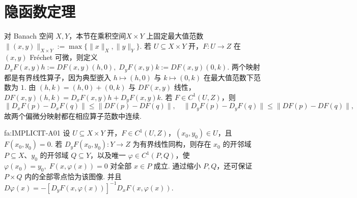 \section{隐函数定理}\label{sec:iii02-implicit}

对 Banach 空间 \(\displaystyle X,Y\)，本节在乘积空间\(\displaystyle X\times Y\) 上固定最大值范数
\(\displaystyle \|(x,y)\|_{X\times Y} := \max\{\|x\|_X,\|y\|_Y\}.\)
若 \(\displaystyle U\subseteq X\times Y\) 开，\(\displaystyle F:U\to Z\) 在 \(\displaystyle(x,y)\) Fréchet 可微，则定义
\(\displaystyle D_xF(x,y)h := DF(x,y)(h,0), \; D_yF(x,y)k := DF(x,y)(0,k).\)
两个映射都是有界线性算子，因为典型嵌入 \(\displaystyle h\mapsto(h,0)\) 与 \(\displaystyle k\mapsto(0,k)\) 在最大值范数下范数为 \(\displaystyle1\). 由 \(\displaystyle(h,k)=(h,0)+(0,k)\) 与 \(\displaystyle DF(x,y)\) 线性，
\(\displaystyle DF(x,y)(h,k) = D_xF(x,y)h+D_yF(x,y)k.\)
若 \(\displaystyle F\in C^1(U,Z)\)，则
\[
\|D_xF(p)-D_xF(q)\|
\leqslant
\|DF(p)-DF(q)\|,
\quad
\|D_yF(p)-D_yF(q)\|
\leqslant
\|DF(p)-DF(q)\|,
\]
故两个偏微分映射都在相应算子范数中连续.

\begin{FATheorem}{fa:IMPLICIT-A01}
设 \(\displaystyle U\subseteq X\times Y\) 开，\(\displaystyle F\in C^1(U,Z)\)，\(\displaystyle(x_0,y_0)\in U\)，且
\(\displaystyle F(x_0,y_0)=0.\)
若
\(\displaystyle D_yF(x_0,y_0):Y\to Z\)
为有界线性同构，则存在 \(\displaystyle x_0\) 的开邻域 \(\displaystyle P\subseteq X\)、\(\displaystyle y_0\) 的开邻域 \(\displaystyle Q\subseteq Y\)，以及唯一 \(\displaystyle\varphi\in C^1(P,Q)\)，使
\(\displaystyle \varphi(x_0)=y_0, \; F(x,\varphi(x))=0\)
对全部 \(\displaystyle x\in P\) 成立. 通过缩小 \(\displaystyle P,Q\)，还可保证 \(\displaystyle P\times Q\) 内的全部零点恰为该图像. 并且
\(\displaystyle D\varphi(x) = -[D_yF(x,\varphi(x))]^{-1}D_xF(x,\varphi(x)).\)
\end{FATheorem}

